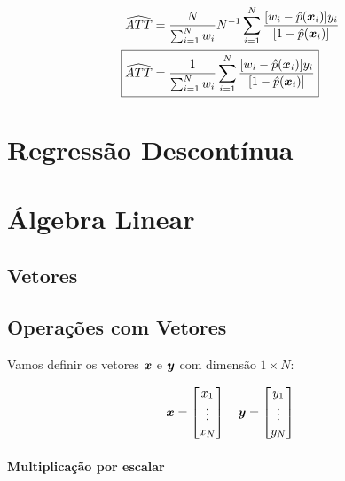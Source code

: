 \documentclass[11pt, oneside, a4paper, article]{article}
\numberwithin{equation}{section}
\begin{document}
\begin{description}
\vspace{-1.5 em}
\begin{align*}
	\widehat{ATT} &=
	\frac{N}{\sum_{i=1}^{N} w_{i} }
	N^{-1} \sum_{i=1}^{N}
	\frac{[ w_{i} - \hat{p}(\xvec_{i} ) ] y_{i} }{[ 1 - \hat{p}( \xvec_{i} ) ]}
	\\
	\Aboxed{
		\widehat{ATT} &=
		\frac{1}{\sum_{i=1}^{N} w_{i} }
		\sum_{i=1}^{N}
		\frac{[ w_{i} - \hat{p}(\xvec_{i} ) ] y_{i} }{[1 - \hat{p}( \xvec_{i} ) ]}
	}
\end{align*}

\clearpage
\section{Regressão Descontínua}

\clearpage
\section{Álgebra Linear}

\subsection{Vetores}


\subsection{Operações com Vetores}

Vamos definir os vetores $\boldsymbol{x}$ e $\boldsymbol{y}$ com dimensão $1 \times N$:

\begin{align*}
	\boldsymbol{x} = 
	\begin{bmatrix}
		x_{1} \\ \vdots \\ x_{N}	
	\end{bmatrix}
	\quad
	\boldsymbol{y} = 
	\begin{bmatrix}
		y_{1} \\ \vdots \\ y_{N}	
	\end{bmatrix}
\end{align*}

\paragraph{Multiplicação por escalar}


\end{description}
\end{document}

